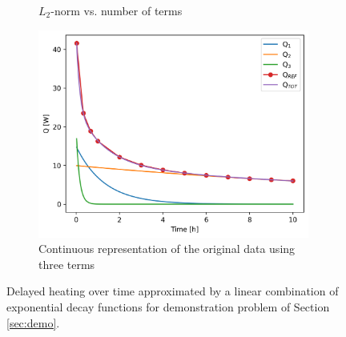\begin{figure}[htbp!]
\begin{subfigure}[b]{0.48\textwidth}
    \caption{$L_2$-norm vs. number of terms}
    \label{fig:modes-demo-b}
  \end{subfigure}
  \hfill
  \begin{subfigure}[b]{0.48\textwidth}
    \centering
    \includegraphics[width=0.98\textwidth]{figures/demo-deco-2}
    \caption{Continuous representation of the original data using three terms}
    \label{fig:modes-demo-c}
  \end{subfigure}
  \caption{Delayed heating over time approximated by a linear combination of exponential decay functions for demonstration problem of Section \ref{sec:demo}.}
  \label{fig:modes-demo}
\end{figure}

